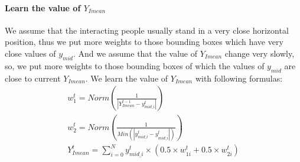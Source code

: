 \paragraph*{Learn the value of \(Y_{Imean}\)}
We assume that the interacting people usually stand in a very close horizontal position, thus we put more weights to those bounding boxes which have very close values of \(y_{mid}\). And we assume that the value of \(Y_{Imean}\) change very slowly, so, we put more weights to those  bounding boxes of which the values of \(y_{mid}\) are close to current \(Y_{Imean}\). We learn the value of \(Y_{Imean}\) with following formulas:
\begin{eqnarray}
	w_1^t = Norm\left(\frac{1}{|Y_{Imean}^{t-1} - y_{mid\_i}^t|}\right) \\
	w_2^t = Norm\left(\frac{1}{Min(|y_{mid\_i}^t - y_{mid \_ \bar i}^t|)}    \right) \\
	Y_{Imean}^t = \sum_{i=0}^N y_{mid\_i}^t \times (0.5 \times w_{1i}^t + 0.5 \times w_{2i}^t)
\end{eqnarray}

